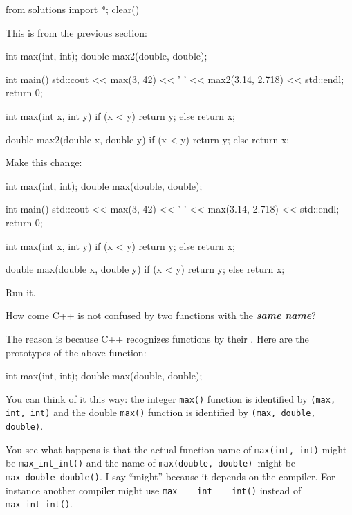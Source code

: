 \begin{python0}
from solutions import *; clear()
\end{python0}

This is from the previous section:

\begin{consolethree}[escapeinside=||]
int max(int, int);
double max2(double, double);

int main()
{
    std::cout << max(3, 42) << ' '
              << max2(3.14, 2.718) << std::endl;
    return 0;
}

int max(int x, int y)
{
    if (x < y) return y;
    else return x;
}

double max2(double x, double y)
{
    if (x < y) return y;
    else return x;
}
\end{consolethree}

Make this change:

\begin{consolethree}[escapeinside=||]
int max(int, int);
double max(double, double);

int main()
{
    std::cout << max(3, 42) << ' '
              << max(3.14, 2.718) << std::endl;
    return 0;
}

int max(int x, int y)
{
    if (x < y) return y;
    else return x;
}

double max(double x, double y)
{
    if (x < y) return y;
    else return x;
}
\end{consolethree}

Run it.


How come C++ is not confused by two functions with the \textbf{\textit{same name}}?

The reason is because C++ recognizes functions by their . Here are the prototypes of the above function:

\begin{consolethree}[escapeinside=||]
int max(int, int);
double max(double, double);
\end{consolethree}

You can think of it this way: the integer \texttt{max()} function is identified by \texttt{(max, int, int)} and the double \texttt{max()} function is identified by \texttt{(max, double, double)}.

You see what happens is that the actual function name of \texttt{max(int, int)} might be \texttt{max\_int\_int()} and the name of \texttt{max(double, double) }might be \texttt{max\_double\_double()}. I say ``might'' because it depends on the compiler. For instance another compiler might use \texttt{max\_\_\_\_int\_\_\_\_int()} instead of \texttt{max\_int\_int()}.

